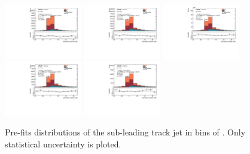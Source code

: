 \begin{figure}[htbp]
  \centering
 \includegraphics[width=0.3\textwidth]{figures/gbb/Sub_Sd0_Fits/Canv_PreFit_-3-logM_bb_over_p_TG--22_LpT_INF_SpT_INF_coarse_y.pdf}
 \includegraphics[width=0.3\textwidth]{figures/gbb/Sub_Sd0_Fits/Canv_PreFit_-22-logM_bb_over_p_TG--19_LpT_INF_SpT_INF_coarse_y.pdf}
 \includegraphics[width=0.3\textwidth]{figures/gbb/Sub_Sd0_Fits/Canv_PreFit_-19-logM_bb_over_p_TG--15_LpT_INF_SpT_INF_coarse_y.pdf}\\
 \includegraphics[width=0.3\textwidth]{figures/gbb/Sub_Sd0_Fits/Canv_PreFit_-15-logM_bb_over_p_TG--11_LpT_INF_SpT_INF_coarse_y.pdf}
 \includegraphics[width=0.3\textwidth]{figures/gbb/Sub_Sd0_Fits/Canv_PreFit_-11-logM_bb_over_p_TG-0_LpT_INF_SpT_INF_coarse_y.pdf}

\caption{Pre-fits \subsdzero distributions of the sub-leading track jet in bins of \mpt. Only statistical uncertainty is ploted.}
  \label{fig:fracmasspt-prefits-subleading-sub}
\end{figure}

